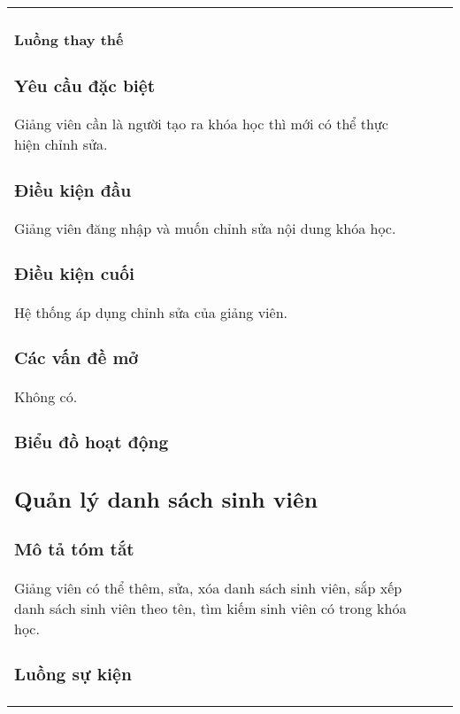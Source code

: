 \documentclass[./../main_file.tex]{subfiles}
\begin{document}
\begin{longtable}{|p{}|p{}|p{}|}
\paragraph{Luồng thay thế}
\subsubsection{Yêu cầu đặc biệt}
Giảng viên cần là người tạo ra khóa học thì mới có thể thực hiện chỉnh sửa.

\subsubsection{Điều kiện đầu}
Giảng viên đăng nhập và muốn chỉnh sửa nội dung khóa học.

\subsubsection{Điều kiện cuối}
Hệ thống áp dụng chỉnh sửa của giảng viên.

\subsubsection{Các vấn đề mở}
Không có.

\subsubsection{Biểu đồ hoạt động}


\subsection{Quản lý danh sách sinh viên}
\subsubsection{Mô tả tóm tắt}
Giảng viên có thể thêm, sửa, xóa danh sách sinh viên, sắp xếp danh sách sinh viên theo tên, tìm kiếm sinh viên có trong khóa học.

\subsubsection{Luồng sự kiện}

\end{longtable}
\end{document}
